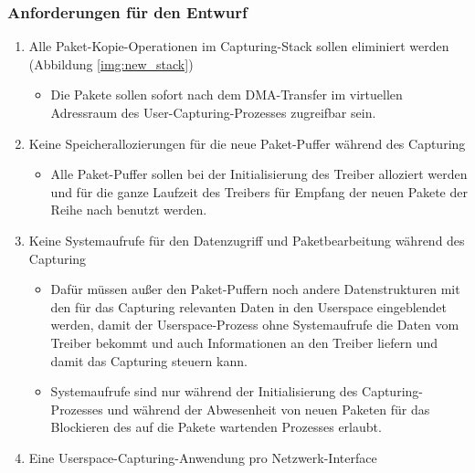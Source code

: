 \subsubsection{Anforderungen für den Entwurf}
\begin{enumerate}
	\item Alle Paket-Kopie-Operationen im Capturing-Stack sollen eliminiert
		werden (Abbildung \ref{img:new_stack})
		\begin{itemize}
			\item Die Pakete sollen sofort nach dem DMA-Transfer im virtuellen 
				Adressraum des User-Capturing-Prozesses zugreifbar sein.
		\end{itemize}
	\item Keine Speicherallozierungen für die neue Paket-Puffer während des Capturing
		\begin{itemize}
			\item Alle Paket-Puffer sollen bei der Initialisierung des Treiber
				alloziert werden und für die ganze Laufzeit des Treibers für
				Empfang der neuen Pakete der Reihe nach benutzt werden.
		\end{itemize}
	\item Keine Systemaufrufe für den Datenzugriff und Paketbearbeitung
		während des Capturing
		\begin{itemize}
			\item Dafür müssen außer den Paket-Puffern noch andere
				Datenstrukturen mit den für das Capturing relevanten Daten in den
				Userspace eingeblendet werden, damit der Userspace-Prozess ohne
				Systemaufrufe die Daten vom Treiber bekommt und auch
				Informationen an den Treiber liefern und damit das Capturing
				steuern kann.
			\item   Systemaufrufe sind nur während der Initialisierung des
				Capturing-Prozesses 
				und während der Abwesenheit von neuen
				Paketen für das Blockieren des auf die Pakete wartenden
				Prozesses erlaubt. 
		\end{itemize}
	\item Eine Userspace-Capturing-Anwendung pro Netzwerk-Interface

\end{enumerate}
